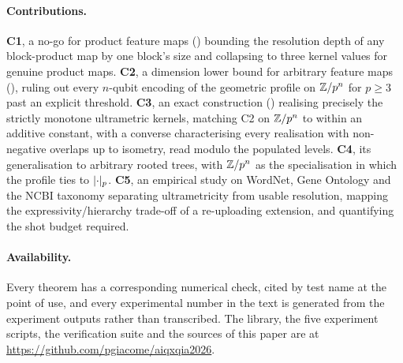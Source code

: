 \paragraph{Contributions.}
\textbf{C1}, a no-go for product feature maps () bounding the
resolution depth of any block-product map by one block's size and collapsing to three
kernel values for genuine product maps. \textbf{C2}, a dimension lower bound for
arbitrary feature maps (), ruling out every $n$-qubit encoding
of the geometric profile on $\mathbb{Z}/p^{n}$ for $p \ge 3$ past an explicit threshold.
\textbf{C3}, an exact construction () realising precisely the
strictly monotone ultrametric kernels, matching C2 on $\mathbb{Z}/p^{n}$ to within an additive
constant, with a converse characterising every realisation with non-negative overlaps
up to isometry, read modulo the populated levels. \textbf{C4}, its generalisation to arbitrary rooted trees, with $\mathbb{Z}/p^{n}$ as the
specialisation in which the profile ties to $\lvert\cdot\rvert_p$. \textbf{C5}, an empirical
study on WordNet, Gene Ontology and the NCBI taxonomy separating ultrametricity from
usable resolution, mapping the expressivity/hierarchy trade-off of a re-uploading
extension, and quantifying the shot budget required.

\paragraph{Availability.}
Every theorem has a corresponding numerical check, cited by test name at the point of
use, and every experimental number in the text is generated from the experiment outputs
rather than transcribed. The library, the five experiment scripts, the verification
suite and the sources of this paper are at
\url{https://github.com/pgiacome/aiqxqia2026}.
